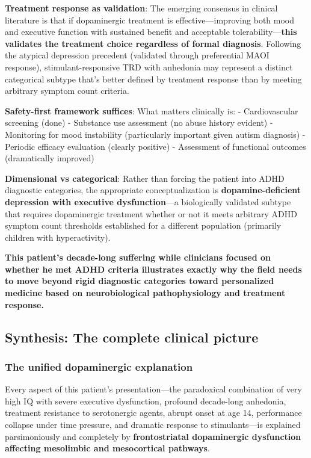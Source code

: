 \textbf{Treatment response as validation}: The emerging consensus in clinical literature is that if dopaminergic treatment is effective---improving both mood and executive function with sustained benefit and acceptable tolerability---\textbf{this validates the treatment choice regardless of formal diagnosis}. Following the atypical depression precedent (validated through preferential MAOI response), stimulant-responsive TRD with anhedonia may represent a distinct categorical subtype that's better defined by treatment response than by meeting arbitrary symptom count criteria.

\textbf{Safety-first framework suffices}: What matters clinically is: - Cardiovascular screening (done) - Substance use assessment (no abuse history evident) - Monitoring for mood instability (particularly important given autism diagnosis) - Periodic efficacy evaluation (clearly positive) - Assessment of functional outcomes (dramatically improved)

\textbf{Dimensional vs categorical}: Rather than forcing the patient into ADHD diagnostic categories, the appropriate conceptualization is \textbf{dopamine-deficient depression with executive dysfunction}---a biologically validated subtype that requires dopaminergic treatment whether or not it meets arbitrary ADHD symptom count thresholds established for a different population (primarily children with hyperactivity).

\textbf{This patient's decade-long suffering while clinicians focused on whether he met ADHD criteria illustrates exactly why the field needs to move beyond rigid diagnostic categories toward personalized medicine based on neurobiological pathophysiology and treatment response.}

\subsection{Synthesis: The complete clinical picture}\label{10a_trd_basis-synthesis-the-complete-clinical-picture}

\subsubsection{The unified dopaminergic explanation}\label{10a_trd_basis-the-unified-dopaminergic-explanation}

Every aspect of this patient's presentation---the paradoxical combination of very high IQ with severe executive dysfunction, profound decade-long anhedonia, treatment resistance to serotonergic agents, abrupt onset at age 14, performance collapse under time pressure, and dramatic response to stimulants---is explained parsimoniously and completely by \textbf{frontostriatal dopaminergic dysfunction affecting mesolimbic and mesocortical pathways}.

